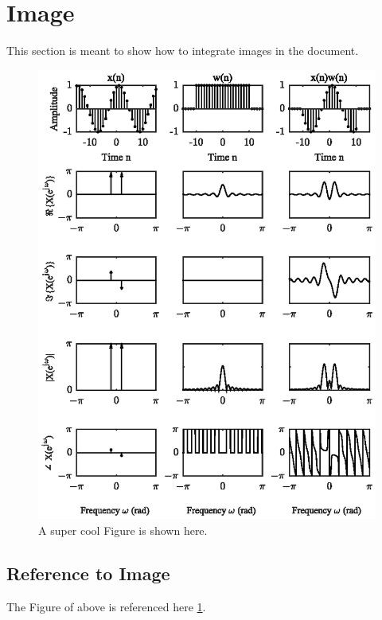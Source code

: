 \newpage

\section{Image}\label{sec:image}
This section is meant to show how to integrate images in the document.

\begin{figure}[H] %
    \centering
    \includegraphics{figures/figure3_1.eps}
    \caption{A super cool Figure is shown here.}\label{Figure31}
\end{figure}


\subsection{Reference to Image}\label{subsec:reference_image}
\noindent The Figure of above is referenced here \cref{Figure31}.